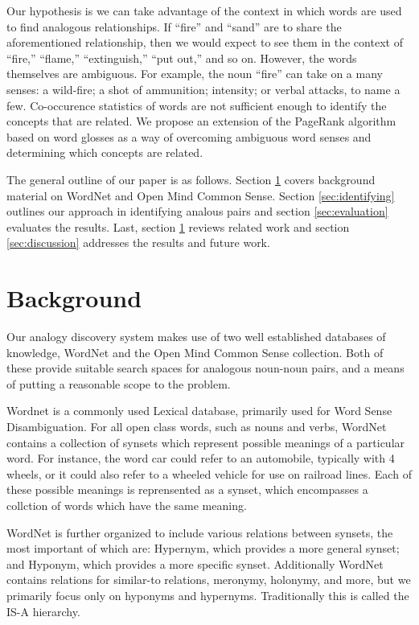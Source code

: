 \documentclass[11pt]{article}
\begin{document}
Our hypothesis is we can take advantage of the context in which words are used
to find analogous relationships.  If ``fire'' and ``sand'' are to share the
aforementioned relationship, then we would expect to see them in the context of
``fire,'' ``flame,'' ``extinguish,'' ``put out,'' and so on.  However, the words
themselves are ambiguous.  For example, the noun ``fire'' can take on a many
senses: a wild-fire; a shot of ammunition; intensity; or verbal attacks, to name
a few.  Co-occurence statistics of words are not sufficient enough to identify
the concepts that are related.  We propose an extension of the PageRank
algorithm based on word glosses as a way of overcoming ambiguous word senses and
determining which concepts are related.

The general outline of our paper is as follows.  Section \ref{sec:background}
covers background material on WordNet and Open Mind Common Sense.  Section
\ref{sec:identifying} outlines our approach in identifying analous pairs and
section \ref{sec:evaluation} evaluates the results.  Last, section
\ref{sec:background} reviews related work and section \ref{sec:discussion}
addresses the results and future work.

\section{Background}
\label{sec:background}

Our analogy discovery system makes use of two well established databases of
knowledge, WordNet \cite{fellbaum98wordnet} and the Open Mind Common Sense
\cite{havasi07conceptnet} collection.  Both of these provide suitable search
spaces for analogous noun-noun pairs, and a means of putting a reasonable scope
to the problem.

Wordnet \cite{fellbaum98wordnet} is a commonly used Lexical database, primarily used for Word Sense
Disambiguation.  For all open class words, such as nouns and verbs, WordNet
contains a collection of synsets which represent possible meanings of a
particular word.  For instance, the word car could refer to an automobile,
typically with 4 wheels, or it could also refer to a wheeled vehicle for use on
railroad lines.  Each of these possible meanings is reprensented as a synset,
which encompasses a collction of words which have the same meaning.

WordNet is further organized to include various relations between synsets, the
most important of which are: Hypernym, which provides a more general synset;
and Hyponym, which provides a more specific synset.  Additionally WordNet
contains relations for similar-to relations, meronymy, holonymy, and more, but
we primarily focus only on hyponyms and hypernyms.  Traditionally this is called
the IS-A hierarchy.
\end{document}
